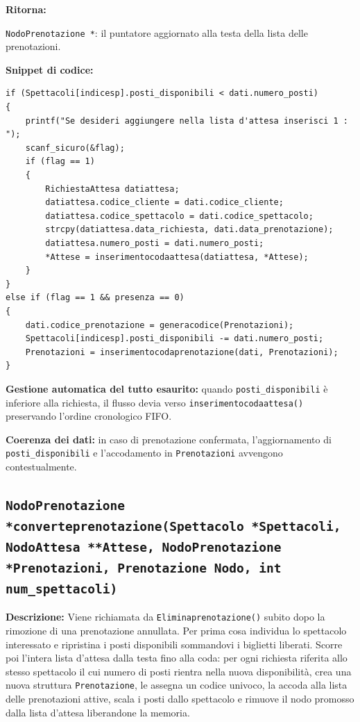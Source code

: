 \documentclass[11pt,a4paper,oneside,openany]{book}
\newenvironment{listacomp}{%
    \small
    \begin{list}{\textendash}{%
        \setlength{\topsep}{2pt}%
        \setlength{\partopsep}{0pt}%
        \setlength{\itemsep}{1pt}%
        \setlength{\parsep}{0pt}%
        \setlength{\leftmargin}{1.2em}%
    }%
}{%
    \end{list}%
}
\begin{document}
\noindent\textbf{Ritorna:}
\begin{listacomp}
    \item \texttt{NodoPrenotazione *}: il puntatore aggiornato alla testa della lista delle prenotazioni.
\end{listacomp}

\begin{samepage}
\noindent\textbf{Snippet di codice:}
\begin{lstlisting}[caption={Smistamento tra lista d'attesa e prenotazione attiva in registraprenotazione()}]
if (Spettacoli[indicesp].posti_disponibili < dati.numero_posti)
{
    printf("Se desideri aggiungere nella lista d'attesa inserisci 1 : ");
    scanf_sicuro(&flag);
    if (flag == 1)
    {
        RichiestaAttesa datiattesa;
        datiattesa.codice_cliente = dati.codice_cliente;
        datiattesa.codice_spettacolo = dati.codice_spettacolo;
        strcpy(datiattesa.data_richiesta, dati.data_prenotazione);
        datiattesa.numero_posti = dati.numero_posti;
        *Attese = inserimentocodaattesa(datiattesa, *Attese);
    }
}
else if (flag == 1 && presenza == 0)
{
    dati.codice_prenotazione = generacodice(Prenotazioni);
    Spettacoli[indicesp].posti_disponibili -= dati.numero_posti;
    Prenotazioni = inserimentocodaprenotazione(dati, Prenotazioni);
}
\end{lstlisting}

\begin{listacomp}
    \item \textbf{Gestione automatica del tutto esaurito:} quando \texttt{posti\_disponibili} è inferiore alla richiesta, il flusso devia verso \texttt{inserimentocodaattesa()} preservando l'ordine cronologico FIFO.
    \item \textbf{Coerenza dei dati:} in caso di prenotazione confermata, l'aggiornamento di \texttt{posti\_disponibili} e l'accodamento in \texttt{Prenotazioni} avvengono contestualmente.
\end{listacomp}
\end{samepage}

\subsection[converteprenotazione()]{\texttt{NodoPrenotazione *converteprenotazione(Spettacolo *Spettacoli, NodoAttesa **Attese, NodoPrenotazione *Prenotazioni, Prenotazione Nodo, int num\_spettacoli)}}\label{sec:converteprenotazione}

\noindent\textbf{Descrizione:}
Viene richiamata da \texttt{Eliminaprenotazione()} subito dopo la rimozione di una prenotazione annullata. Per prima cosa individua lo spettacolo interessato e ripristina i posti disponibili sommandovi i biglietti liberati. Scorre poi l'intera lista d'attesa dalla testa fino alla coda: per ogni richiesta riferita allo stesso spettacolo il cui numero di posti rientra nella nuova disponibilità, crea una nuova struttura \texttt{Prenotazione}, le assegna un codice univoco, la accoda alla lista delle prenotazioni attive, scala i posti dallo spettacolo e rimuove il nodo promosso dalla lista d'attesa liberandone la memoria.
\end{document}
